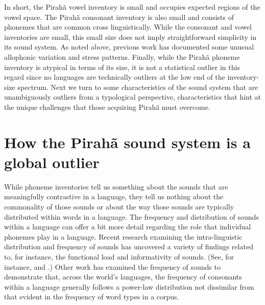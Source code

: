 \documentclass[output=paper,colorlinks,citecolor=brown
]{langscibook}
\begin{document}
    In short, the Pirahã vowel inventory is small and occupies expected regions of the vowel space. The Pirahã consonant inventory is also small and consists of phonemes that are common cross linguistically. While the consonant and vowel inventories are small, this small size does not imply straightforward simplicity in its sound system. As noted above, previous work has documented some unusual allophonic variation and stress patterns.\cite{everett1984relevance, everett1986piraha} Finally, while the Pirahã phoneme inventory is atypical in terms of its size, it is not a statistical outlier in this regard since no languages are technically outliers at the low end of the inventory-size spectrum. Next we turn to some characteristics of the sound system that are unambiguously outliers from a typological perspective, characteristics that hint at the unique challenges that those acquiring Pirahã must overcome.

\section{How the Pirahã sound system is a global outlier}

    While phoneme inventories tell us something about the sounds that are meaningfully contrastive in a language, they tell us nothing about the commonality of those sounds or about the way those sounds are typically distributed within words in a language. The frequency and distribution of sounds within a language can offer a bit more detail regarding the role that individual phonemes play in a language. Recent research examining the intra-linguistic distribution and frequency of sounds has uncovered a variety of findings related to, for instance, the functional load and informativity of sounds. (See, for instance, \cite{wedel2013functional} and \cite{priva2017informativity}.) Other work has examined the frequency of sounds to demonstrate that, across the world’s languages, the frequency of consonants within a language generally follows a power-law distribution not dissimilar from that evident in the frequency of word types in a corpus.\cite{everett2018similar}
    
\end{document}
